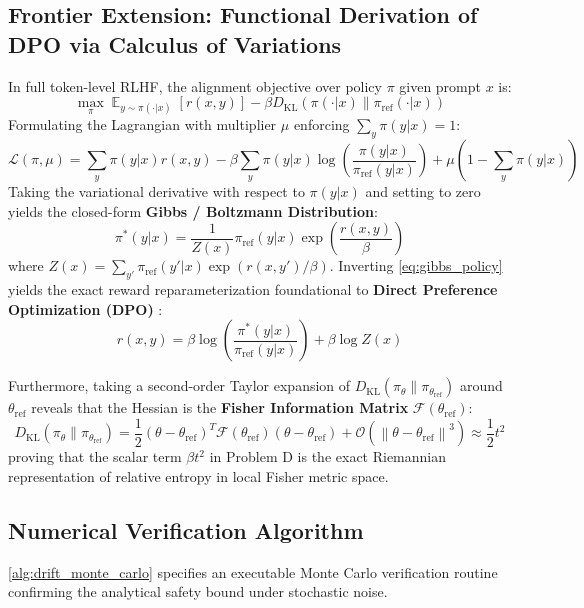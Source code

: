 \documentclass[11pt,a4paper]{article}
\theoremstyle{definition}
\theoremstyle{plain}
\theoremstyle{remark}
\DeclareMathOperator{\E}{\mathbb{E}}
\newcommand{\norm}[1]{\left\lVert#1\right\rVert}
\newcommand{\KL}[2]{D_{\mathrm{KL}}\left(#1 \parallel #2\right)}
\begin{document}
\subsection{Frontier Extension: Functional Derivation of DPO via Calculus of Variations}
In full token-level RLHF, the alignment objective over policy $\pi$ given prompt $x$ is:
\begin{equation}
\max_{\pi} \E_{y \sim \pi(\cdot|x)} [r(x, y)] - \beta \KL{\pi(\cdot|x)}{\pi_{\text{ref}}(\cdot|x)}
\end{equation}
Formulating the Lagrangian with multiplier $\mu$ enforcing $\sum_y \pi(y|x) = 1$:
\begin{equation}
\mathcal{L}(\pi, \mu) = \sum_{y} \pi(y|x) r(x, y) - \beta \sum_y \pi(y|x) \log\left(\frac{\pi(y|x)}{\pi_{\text{ref}}(y|x)}\right) + \mu\left(1 - \sum_y \pi(y|x)\right)
\end{equation}
Taking the variational derivative with respect to $\pi(y|x)$ and setting to zero yields the closed-form \textbf{Gibbs / Boltzmann Distribution}:
\begin{equation}
\pi^*(y|x) = \frac{1}{Z(x)} \pi_{\text{ref}}(y|x) \exp\left(\frac{r(x, y)}{\beta}\right)
\label{eq:gibbs_policy}
\end{equation}
where $Z(x) = \sum_{y'} \pi_{\text{ref}}(y'|x) \exp(r(x, y')/\beta)$. Inverting \cref{eq:gibbs_policy} yields the exact reward reparameterization foundational to \textbf{Direct Preference Optimization (DPO)} \cite{rafailov2023direct}:
\begin{equation}
r(x, y) = \beta \log\left(\frac{\pi^*(y|x)}{\pi_{\text{ref}}(y|x)}\right) + \beta \log Z(x)
\end{equation}

Furthermore, taking a second-order Taylor expansion of $\KL{\pi_\theta}{\pi_{\theta_{\text{ref}}}}$ around $\theta_{\text{ref}}$ reveals that the Hessian is the \textbf{Fisher Information Matrix} $\mathcal{F}(\theta_{\text{ref}})$:
\begin{equation}
\KL{\pi_\theta}{\pi_{\theta_{\text{ref}}}} = \frac{1}{2} (\theta - \theta_{\text{ref}})^T \mathcal{F}(\theta_{\text{ref}}) (\theta - \theta_{\text{ref}}) + \mathcal{O}(\norm{\theta - \theta_{\text{ref}}}^3) \approx \frac{1}{2} t^2
\end{equation}
proving that the scalar term $\beta t^2$ in Problem D is the exact Riemannian representation of relative entropy in local Fisher metric space.

\subsection{Numerical Verification Algorithm}
\cref{alg:drift_monte_carlo} specifies an executable Monte Carlo verification routine confirming the analytical safety bound under stochastic noise.
\end{document}
